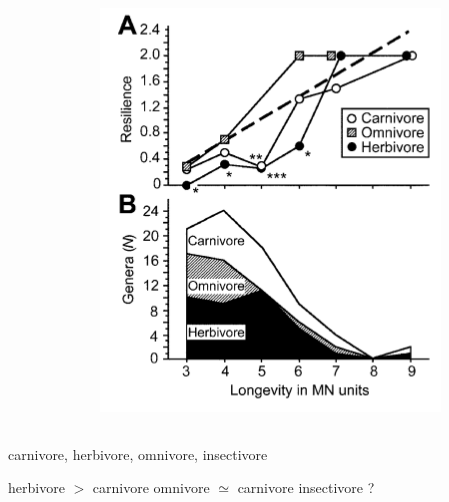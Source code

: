 \documentclass{beamer}
\begin{document}
\begin{frame}
\begin{columns}
\begin{column}{0.5\textwidth}
    \end{column}
    \begin{column}{0.5\textwidth}
      \includegraphics[height=0.5\textheight,width=\textwidth,keepaspectratio=true]{figure/jernvall}
    \end{column}
  \end{columns}

  \begin{center}
      carnivore, herbivore, omnivore, insectivore
      
      \vspace{0.2cm}

      herbivore \(>\) carnivore \hspace{0.3cm} omnivore \(\simeq\) carnivore \hspace{0.5cm} insectivore ?

    \end{center}
\end{frame}
\end{document}

